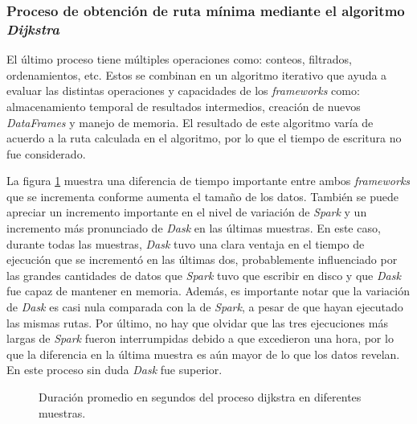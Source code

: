 \subsubsection{Proceso de obtención de ruta mínima mediante el algoritmo \textit{Dijkstra}}

El último proceso tiene múltiples operaciones como: conteos, filtrados, ordenamientos, etc. Estos se combinan en un algoritmo iterativo que ayuda a evaluar las distintas operaciones y capacidades de los \textit{frameworks} como: almacenamiento temporal de resultados intermedios, creación de nuevos \textit{DataFrames} y manejo de memoria. El resultado de este algoritmo varía de acuerdo a la ruta calculada en el algoritmo, por lo que el tiempo de escritura no fue considerado.

La figura \ref{lineas:nube-dijkstra} muestra una diferencia de tiempo importante entre ambos \textit{frameworks} que se incrementa conforme aumenta el tamaño de los datos. También se puede apreciar un incremento importante en el nivel de variación de \textit{Spark} y un incremento más pronunciado de \textit{Dask} en las últimas muestras. En este caso, durante todas las muestras, \textit{Dask} tuvo una clara ventaja en el tiempo de ejecución que se incrementó en las últimas dos, probablemente influenciado por las grandes cantidades de datos que \textit{Spark} tuvo que escribir en disco y que \textit{Dask} fue capaz de mantener en memoria. Además, es importante notar que la variación de \textit{Dask} es casi nula comparada con la de \textit{Spark}, a pesar de que hayan ejecutado las mismas rutas. Por último, no hay que olvidar que las tres ejecuciones más largas de \textit{Spark} fueron interrumpidas debido a que excedieron una hora, por lo que la diferencia en la última muestra es aún mayor de lo que los datos revelan. En este proceso sin duda \textit{Dask} fue superior.


\begin{figure}
\centering
{}
\caption{Duración promedio en segundos del proceso dijkstra en diferentes muestras.}
\label{lineas:nube-dijkstra}
\end{figure}

